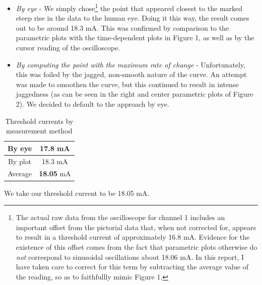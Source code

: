 \documentclass[10pt,a4paper]{article}
\begin{document}
\begin{itemize}
\item \textit{By eye} - We simply chose\footnote{The actual raw data from the oscilloscope for channel 1 includes an important offset from the pictorial data that, when not corrected for, appears to result in a threshold current of approximately 16.8 mA. Evidence for the existence of this offset comes from the fact that parametric plots otherwise do \textsl{not} correspond to sinusoidal oscillations about 18.06 mA.  In this report, I have taken care to correct for this term by subtracting the average value of the reading, so as to faithfullly mimic Figure 1.} the point that appeared closest to the marked steep rise in the data to the human eye. Doing it this way, the result comes out to be around 18.3 mA. This was confirmed by comparison to the parametric plots with the time-dependent plots in Figure 1, as well as by the cursor reading of the oscilloscope.
\item \textit{By computing the point with the maximum rate of change} - Unfortunately, this was foiled by the jagged, non-smooth nature of the curve. An attempt was made to smoothen the curve, but this continued to result in intense jaggedness (as can be seen in the right and center parametric plots of Figure 2). We decided to default to the approach by eye.
\end{itemize}
\begin{table}[H]
\centering
\begin{tabular}{|c|c|}
\hline 
By eye & 17.8 mA \\ 
\hline 
By plot & 18.3 mA \\ 
\hline 
Average & \textbf{18.05} mA\\
\hline
\end{tabular} 
\caption{Threshold currents by measurement method}
\end{table}
We take our threshold current to be 18.05 mA.
\end{document}
